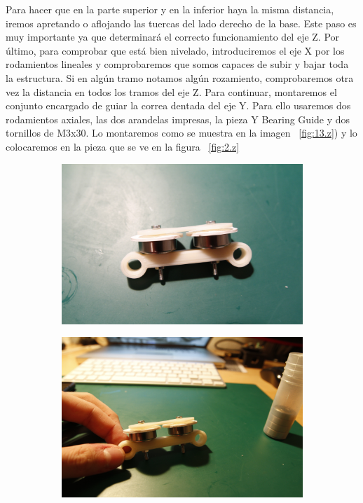 		Para hacer que en la parte superior y en la inferior haya la misma distancia, iremos apretando o aflojando las tuercas del lado derecho de la base. Este paso es muy importante ya que determinará el correcto funcionamiento del eje Z. Por último, para comprobar que está bien nivelado, introduciremos el eje X por los rodamientos lineales y comprobaremos que somos capaces de subir y bajar toda la estructura. Si en algún tramo notamos algún rozamiento, comprobaremos otra vez la distancia en todos los tramos del eje Z.
		Para continuar, montaremos el conjunto encargado de guiar la correa dentada del eje Y.
		Para ello usaremos dos rodamientos axiales, las dos arandelas impresas, la pieza Y Bearing Guide y dos tornillos de M3x30. Lo montaremos como se muestra en la imagen ~\ref{fig:13.z}) y lo colocaremos en la pieza que se ve en la figura ~\ref{fig:2.z}
		\begin{figure}[H]
		        \centering
		        \begin{subfigure}[htb]{0.5\textwidth}
		                \centering
		                \includegraphics[width=\textwidth]{../../Fotos/71.jpg}
		                \label{fig:11.z}
		        \end{subfigure}
		        \begin{subfigure}[htb]{0.5\textwidth}
		                \centering
		                \includegraphics[width=\textwidth]{../../Fotos/71b.jpg}

\end{subfigure}
\end{figure}
